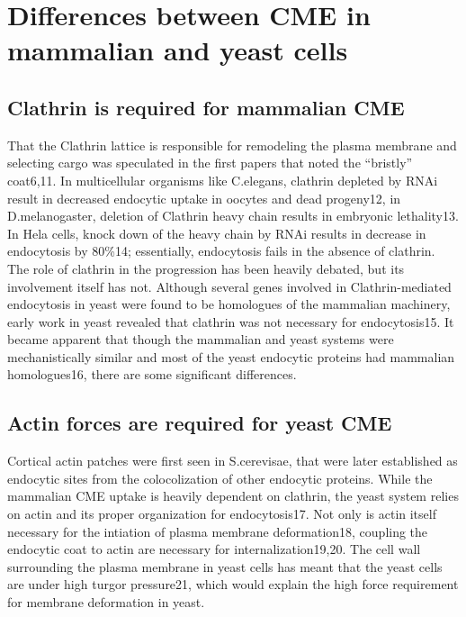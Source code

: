 	
\section{Differences between CME in mammalian and yeast cells }
		\subsection{Clathrin is required for mammalian CME}
		That the Clathrin lattice is responsible for remodeling the plasma membrane and selecting cargo was speculated in the first papers that noted the “bristly” coat6,11.  In multicellular organisms like C.elegans, clathrin depleted by RNAi result in decreased endocytic uptake in oocytes and dead progeny12, in D.melanogaster, deletion of Clathrin heavy chain results in embryonic lethality13. In Hela cells, knock down of the heavy chain by RNAi results in decrease in endocytosis by 80\%14; essentially, endocytosis fails in the absence of clathrin. The role of clathrin in the progression has been heavily debated, but its involvement itself has not. Although several genes involved in Clathrin-mediated endocytosis in yeast were found to be homologues of the mammalian machinery, early work in yeast revealed that clathrin was not necessary for endocytosis15. It became apparent that though the mammalian and yeast systems were mechanistically similar and most of the yeast endocytic proteins had mammalian homologues16, there are some significant differences. 

		\subsection{Actin forces are required for yeast CME}
		Cortical actin patches were first seen in S.cerevisae, that were later established as endocytic sites from the colocolization of other endocytic proteins. While the mammalian CME uptake is heavily dependent on clathrin, the yeast system relies on actin and its proper organization for endocytosis17. Not only is actin itself necessary for the intiation of plasma membrane deformation18, coupling the endocytic coat to actin are necessary for internalization19,20.  The cell wall surrounding the plasma membrane in yeast cells has meant that the yeast cells are under high turgor pressure21, which would explain the high force requirement for membrane deformation in yeast. 

	
